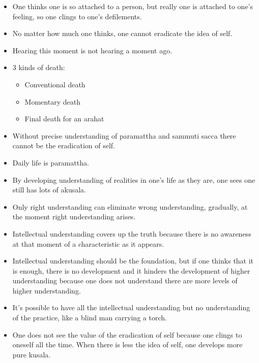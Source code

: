 \documentclass{article}
\begin{document}
\begin{itemize}
\item 
  One thinks one is so attached to a person, but really one is
  attached to one's feeling, so one clings to one's defilements.

\item 
  No matter how much one thinks, one cannot eradicate the idea of
  self.

\item 
  Hearing this moment is not hearing a moment ago.

\item 
  3 kinds of death:

  \begin{itemize}
  \item 
    Conventional death

  \item 
    Momentary death

  \item 
    Final death for an arahat

  \end{itemize}
\item 
  Without precise understanding of paramattha and sammuti sacca there
  cannot be the eradication of self.

\item 
  Daily life is paramattha.

\item 
  By developing understanding of realities in one's life as they are,
  one sees one still has lots of akusala.

\item 
  Only right understanding can eliminate wrong understanding,
  gradually, at the moment right understanding arises.

\item 
  Intellectual understanding covers up the truth because there is no
  awareness at that moment of a characteristic as it appears.

\item 
  Intellectual understanding should be the foundation, but if one
  thinks that it is enough, there is no development and it hinders
  the development of higher understanding because one does not
  understand there are more levels of higher understanding.

\item 
  It's possible to have all the intellectual understanding but no
  understanding of the practice, like a blind man carrying a torch.

\item 
  One does not see the value of the eradication of self because one
  clings to oneself all the time. When there is less the idea of
  self, one develops more pure kusala.


\end{itemize}
\end{document}

